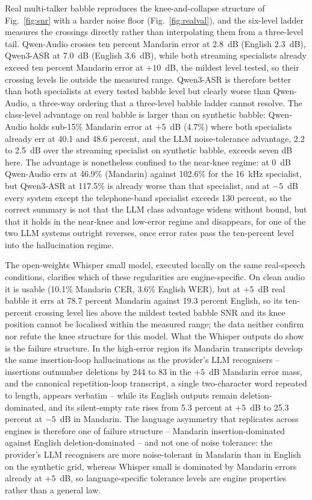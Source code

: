 Real multi-talker babble reproduces the knee-and-collapse structure of
Fig.~\ref{fig:snr} with a harder noise floor
(Fig.~\ref{fig:realval}), and the six-level ladder measures the crossings
directly rather than interpolating them from a three-level tail. Qwen-Audio
crosses ten percent Mandarin error at 2.8~dB (English 2.3~dB), Qwen3-ASR at
7.0~dB (English 3.6~dB), while both streaming specialists already exceed
ten percent Mandarin error at $+10$~dB, the mildest level tested, so their
crossing levels lie outside the measured range. Qwen3-ASR is therefore
better than both specialists at every tested babble level but clearly
worse than Qwen-Audio, a three-way ordering that a three-level babble
ladder cannot resolve. The class-level advantage on real
babble is larger than on synthetic babble: Qwen-Audio holds sub-15\%
Mandarin error at $+5$~dB (4.7\%) where both specialists already err at 40.1
and 48.6 percent, and the LLM noise-tolerance advantage, 2.2 to 2.5~dB over
the streaming specialist on synthetic babble, exceeds seven dB here. The
advantage is nonetheless confined to the near-knee regime: at $0$~dB
Qwen-Audio errs at 46.9\% (Mandarin) against 102.6\% for the 16~kHz
specialist, but Qwen3-ASR at 117.5\% is already worse than that specialist,
and at $-5$~dB every system except the telephone-band specialist exceeds
130 percent, so the correct summary is not that the LLM class advantage
widens without bound, but that it holds in the near-knee and low-error
regime and disappears, for one of the two LLM systems outright reverses,
once error rates pass the ten-percent level into the hallucination regime.

The open-weights Whisper small model, executed locally on the same
real-speech conditions, clarifies which of these regularities are
engine-specific. On clean audio it is usable (10.1\% Mandarin CER, 3.6\%
English WER), but at $+5$~dB real babble it errs at 78.7 percent Mandarin
against 19.3 percent English, so its ten-percent crossing level lies above
the mildest tested babble SNR and its knee position cannot be localised
within the measured range; the data neither confirm nor refute the knee
structure for this model. What the Whisper outputs do show is the failure
structure. In the high-error region its Mandarin transcripts develop the
same insertion-loop hallucinations as the provider's LLM recognisers --
insertions outnumber deletions by 244 to 83 in the $+5$~dB Mandarin error
mass, and the canonical repetition-loop transcript, a single two-character
word repeated to length, appears verbatim -- while its English outputs
remain deletion-dominated, and its silent-empty rate rises from 5.3 percent
at $+5$~dB to 25.3 percent at $-5$~dB in Mandarin. The language asymmetry
that replicates across engines is therefore one of failure structure --
Mandarin insertion-dominated against English deletion-dominated -- and not
one of noise tolerance: the provider's LLM recognisers are more
noise-tolerant in Mandarin than in English on the synthetic grid, whereas
Whisper small is dominated by Mandarin errors already at $+5$~dB, so
language-specific tolerance levels are engine properties rather than a
general law.

